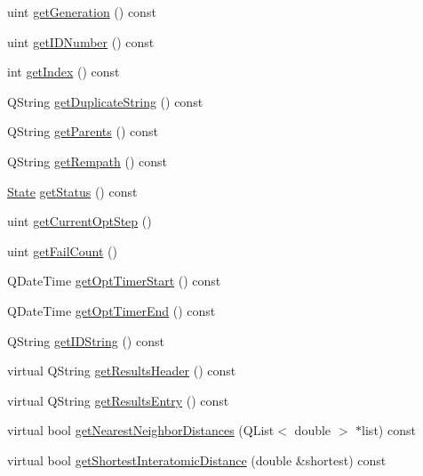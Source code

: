 \begin{DoxyCompactItemize}
\item 
uint \hyperlink{classGlobalSearch_1_1Structure_a7caa9c46c88ac5711cf9d150bd0dcbd6}{get\-Generation} () const 
\item 
uint \hyperlink{classGlobalSearch_1_1Structure_afc86429da4b4d6673a8c33a58841905d}{get\-I\-D\-Number} () const 
\item 
int \hyperlink{classGlobalSearch_1_1Structure_a73f8f57a695b3bebdea8a8b3d75e4138}{get\-Index} () const 
\item 
Q\-String \hyperlink{classGlobalSearch_1_1Structure_a495b4fd01788d6d10b3d6b138784d52d}{get\-Duplicate\-String} () const 
\item 
Q\-String \hyperlink{classGlobalSearch_1_1Structure_a0b30437b5e6cc5e6f3de9c413aa04847}{get\-Parents} () const 
\item 
Q\-String \hyperlink{classGlobalSearch_1_1Structure_a9294a602bcf48745259368025434b796}{get\-Rempath} () const 
\item 
\hyperlink{classGlobalSearch_1_1Structure_a3f1e44cb4f603fe1b3fbc8e813535917}{State} \hyperlink{classGlobalSearch_1_1Structure_ad67c972a173cddc939e3adabf65dd72b}{get\-Status} () const 
\item 
uint \hyperlink{classGlobalSearch_1_1Structure_a955a416ce3d99e5ecc0a68c23e33824c}{get\-Current\-Opt\-Step} ()
\item 
uint \hyperlink{classGlobalSearch_1_1Structure_a39a044521e91f117be11fcf9a1a562b3}{get\-Fail\-Count} ()
\item 
Q\-Date\-Time \hyperlink{classGlobalSearch_1_1Structure_a17a4bd931cc52643bb89a19c9298fc7f}{get\-Opt\-Timer\-Start} () const 
\item 
Q\-Date\-Time \hyperlink{classGlobalSearch_1_1Structure_a720cde3d4eabbeca51fd41160a89fb70}{get\-Opt\-Timer\-End} () const 
\item 
Q\-String \hyperlink{classGlobalSearch_1_1Structure_a38b039e671cdcae7eab7b976c93255de}{get\-I\-D\-String} () const 
\item 
virtual Q\-String \hyperlink{classGlobalSearch_1_1Structure_a5f4dde0d82dbf949fffd514ccb9fd7ac}{get\-Results\-Header} () const 
\item 
virtual Q\-String \hyperlink{classGlobalSearch_1_1Structure_a28886a7dbbde4d7320ea05aa6c50c2e6}{get\-Results\-Entry} () const 
\item 
virtual bool \hyperlink{classGlobalSearch_1_1Structure_ad5d59a1e8739f9cec4c39ca6d576d22a}{get\-Nearest\-Neighbor\-Distances} (Q\-List$<$ double $>$ $\ast$list) const 
\item 
virtual bool \hyperlink{classGlobalSearch_1_1Structure_adee82bcb74af1c15bb91e5a9aa0e3849}{get\-Shortest\-Interatomic\-Distance} (double \&shortest) const 

\end{DoxyCompactItemize}
